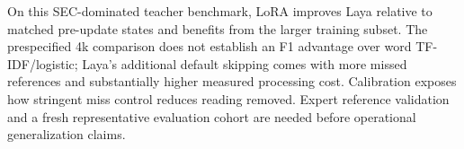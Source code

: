 On this SEC-dominated teacher benchmark, LoRA improves Laya relative to matched pre-update states and benefits from the larger training subset. The prespecified 4k comparison does not establish an F1 advantage over word TF-IDF/logistic; Laya's additional default skipping comes with more missed references and substantially higher measured processing cost. Calibration exposes how stringent miss control reduces reading removed. Expert reference validation and a fresh representative evaluation cohort are needed before operational generalization claims.

